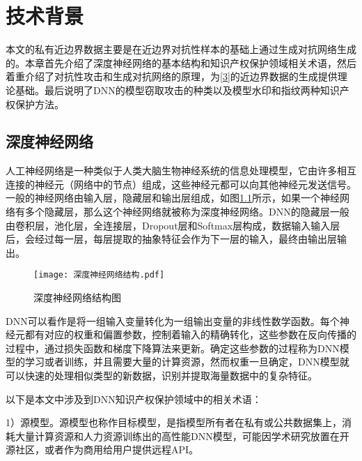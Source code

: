 

\chapter{技术背景} 
\label{2}

本文的私有近边界数据主要是在近边界对抗性样本的基础上通过生成对抗网络生成的。本章首先介绍了深度神经网络的基本结构和知识产权保护领域相关术语，然后着重介绍了对抗性攻击和生成对抗网络的原理，为\ref{3}的近边界数据的生成提供理论基础。最后说明了DNN的模型窃取攻击的种类以及模型水印和指纹两种知识产权保护方法。

\section{深度神经网络}

人工神经网络是一种类似于人类大脑生物神经系统的信息处理模型，它由许多相互连接的神经元（网络中的节点）组成，这些神经元都可以向其他神经元发送信号。一般的神经网络由输入层，隐藏层和输出层组成，如图\ref{深度神经网络结构图}所示，如果一个神经网络有多个隐藏层，那么这个神经网络就被称为深度神经网络。DNN的隐藏层一般由卷积层，池化层，全连接层，Dropout层和Softmax层构成，数据输入输入层后，会经过每一层，每层提取的抽象特征会作为下一层的输入，最终由输出层输出。

\begin{figure}[htbp]%
	\centering
	\setlength{\abovecaptionskip}{3mm} %
	\setlength{\belowcaptionskip}{-3mm} %
	\texttt{[image: 深度神经网络结构.pdf]}
	\caption{深度神经网络结构图}
	\label{深度神经网络结构图}
	\end {figure}

DNN可以看作是将一组输入变量转化为一组输出变量的非线性数学函数。每个神经元都有对应的权重和偏置参数，控制着输入的精确转化，这些参数在反向传播的过程中，通过损失函数和梯度下降算法来更新。确定这些参数的过程称为DNN模型的学习或者训练，并且需要大量的计算资源，然而权重一旦确定，DNN模型就可以快速的处理相似类型的新数据，识别并提取海量数据中的复杂特征。

以下是本文中涉及到DNN知识产权保护领域中的相关术语：

1）源模型。源模型也称作目标模型，是指模型所有者在私有或公共数据集上，消耗大量计算资源和人力资源训练出的高性能DNN模型，可能因学术研究放置在开源社区，或者作为商用给用户提供远程API。

